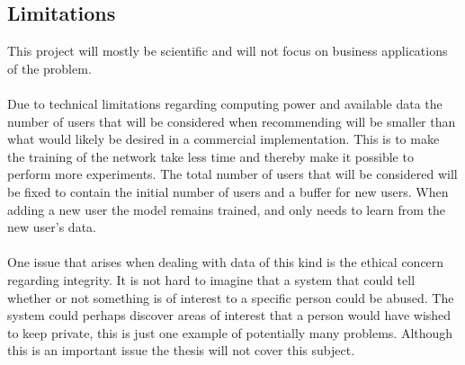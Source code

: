 \subsection{Limitations}
This project will mostly be scientific and will not focus on business applications of the problem.
\\\\
Due  to  technical  limitations  regarding  computing  power  and  available  data  the number of users that will be considered when recommending will be smaller than what would likely be desired in a commercial implementation. This  is  to  make  the training  of  the  network  take  less  time  and  thereby make it possible to perform more experiments. The total number of users that will be considered will be fixed to contain the initial number of users and a buffer for new users. When adding a new user the model remains trained, and only needs to learn from the new user’s data.
\\\\
One issue that arises when dealing with data of this kind is the ethical concern regarding integrity. It is not hard to imagine that a system that could tell whether or not something is of interest to a specific person could be abused. The system could perhaps discover areas of interest that a person would have wished to keep private, this is just one example of potentially many problems. Although this is an important issue the thesis will not cover this subject. 